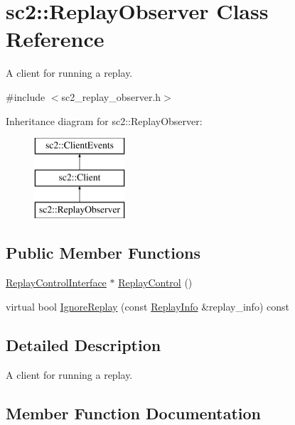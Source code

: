 \hypertarget{classsc2_1_1_replay_observer}{}\section{sc2\+:\+:Replay\+Observer Class Reference}
\label{classsc2_1_1_replay_observer}


A client for running a replay.  




{\ttfamily \#include $<$sc2\+\_\+replay\+\_\+observer.\+h$>$}

Inheritance diagram for sc2\+:\+:Replay\+Observer\+:\begin{figure}[H]
\begin{center}
\leavevmode
\includegraphics[height=3.000000cm]{classsc2_1_1_replay_observer}
\end{center}
\end{figure}
\subsection*{Public Member Functions}
\begin{DoxyCompactItemize}
\item 
\hyperlink{classsc2_1_1_replay_control_interface}{Replay\+Control\+Interface} $\ast$ \hyperlink{classsc2_1_1_replay_observer_a99198b2295dc998662b929f96ad17d65}{Replay\+Control} ()
\item 
virtual bool \hyperlink{classsc2_1_1_replay_observer_ac45036d3304612bc02b9794cc9eba187}{Ignore\+Replay} (const \hyperlink{structsc2_1_1_replay_info}{Replay\+Info} \&replay\+\_\+info) const
\end{DoxyCompactItemize}


\subsection{Detailed Description}
A client for running a replay. 

\subsection{Member Function Documentation}
\mbox{\label{classsc2_1_1_replay_observer_ac45036d3304612bc02b9794cc9eba187}} 
